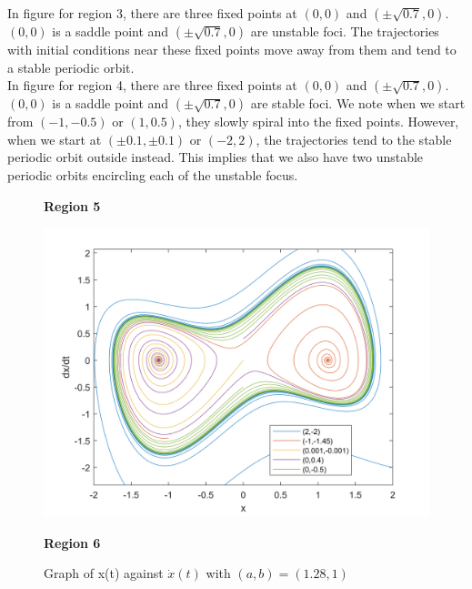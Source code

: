 \documentclass[10pt]{article}
\begin{document}
\noindent In figure for region 3, there are three fixed points at $(0,0)$ and $(\pm\sqrt{0.7},0)$. $(0,0)$ is a saddle point and $(\pm\sqrt{0.7},0)$ are unstable foci. The trajectories with initial conditions near these fixed points move away from them and tend to a stable periodic orbit.\\
In figure for region 4, there are three fixed points at $(0,0)$ and $(\pm\sqrt{0.7},0)$. $(0,0)$ is a saddle point and $(\pm\sqrt{0.7},0)$ are stable foci. We note when we start from $(-1,-0.5)$ or $(1,0.5)$, they slowly spiral into the fixed points. However, when we start at $(\pm0.1,\pm0.1)$ or $(-2,2)$, the trajectories tend to the stable periodic orbit outside instead. This implies that we also have two unstable periodic orbits encircling each of the unstable focus.
\begin{figure}[H]
    \begin{minipage}[b]{0.5\linewidth}
            \centering
            \textbf{Region 5}\par
            \includegraphics[width=\textwidth]{Files/q6,region5.png}
            \caption{Graph of x(t) against $\dot{x}(t)$ with $(a,b)=(1.28,1)$}
        \end{minipage}
        \hfill
        \begin{minipage}[b]{0.5\linewidth}
            \centering
            \textbf{Region 6}\par

\end{minipage}
\end{figure}
\end{document}
